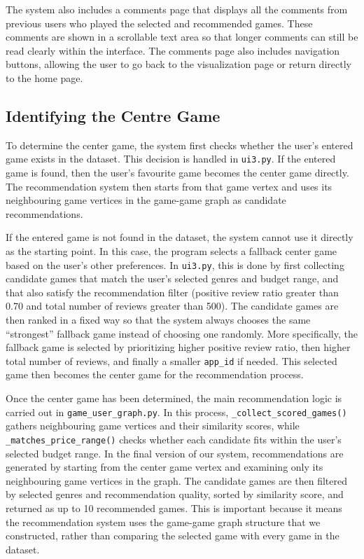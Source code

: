 \documentclass[fontsize=11pt]{article}
\begin{document}
The system also includes a comments page that displays all the comments from previous users who played the selected and recommended games. These comments are shown in a scrollable text area so that longer comments can still be read clearly within the interface. The comments page also includes navigation buttons, allowing the user to go back to the visualization page or return directly to the home page.

\subsection{Identifying the Centre Game}

To determine the center game, the system first checks whether the user’s entered game exists in the dataset. This decision is handled in \texttt{ui3.py}. If the entered game is found, then the user’s favourite game becomes the center game directly. The recommendation system then starts from that game vertex and uses its neighbouring game vertices in the game-game graph as candidate recommendations.

If the entered game is not found in the dataset, the system cannot use it directly as the starting point. In this case, the program selects a fallback center game based on the user’s other preferences. In \texttt{ui3.py}, this is done by first collecting candidate games that match the user’s selected genres and budget range, and that also satisfy the recommendation filter (positive review ratio greater than 0.70 and total number of reviews greater than 500). The candidate games are then ranked in a fixed way so that the system always chooses the same ``strongest'' fallback game instead of choosing one randomly. More specifically, the fallback game is selected by prioritizing higher positive review ratio, then higher total number of reviews, and finally a smaller \texttt{app\_id} if needed. This selected game then becomes the center game for the recommendation process.

Once the center game has been determined, the main recommendation logic is carried out in \texttt{game\_user\_graph.py}. In this process, \texttt{\_collect\_scored\_games()} gathers neighbouring game vertices and their similarity scores, while \texttt{\_matches\_price\_range()} checks whether each candidate fits within the user’s selected budget range. In the final version of our system, recommendations are generated by starting from the center game vertex and examining only its neighbouring game vertices in the graph. The candidate games are then filtered by selected genres and recommendation quality, sorted by similarity score, and returned as up to 10 recommended games. This is important because it means the recommendation system uses the game-game graph structure that we constructed, rather than comparing the selected game with every game in the dataset.
\end{document}
